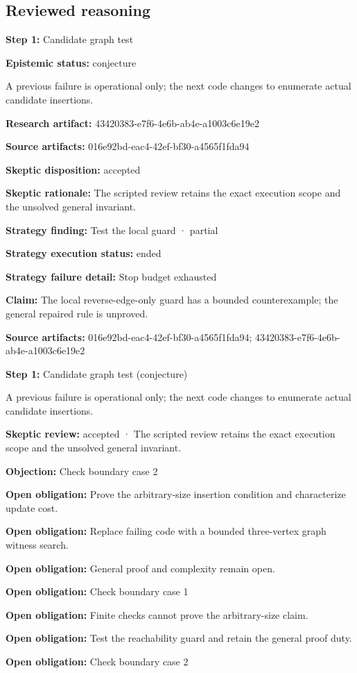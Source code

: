 \documentclass[11pt]{article}
\begin{document}
\subsection{Reviewed reasoning}
\textbf{Step 1:} Candidate graph test\par
\textbf{Epistemic status:} conjecture\par
A previous failure is operational only; the next code changes to enumerate actual candidate insertions.\par
\textbf{Research artifact:} 43420383-e7f6-4e6b-ab4e-a1003c6e19e2\par
\textbf{Source artifacts:} 016e92bd-eac4-42ef-bf30-a4565f1fda94\par
\textbf{Skeptic disposition:} accepted\par
\textbf{Skeptic rationale:} The scripted review retains the exact execution scope and the unsolved general invariant.\par
\textbf{Strategy finding:} Test the local guard · partial\par
\textbf{Strategy execution status:} ended\par
\textbf{Strategy failure detail:} Stop budget exhausted\par
\textbf{Claim:} The local reverse-edge-only guard has a bounded counterexample; the general repaired rule is unproved.\par
\textbf{Source artifacts:} 016e92bd-eac4-42ef-bf30-a4565f1fda94; 43420383-e7f6-4e6b-ab4e-a1003c6e19e2\par
\textbf{Step 1:} Candidate graph test (conjecture)\par
A previous failure is operational only; the next code changes to enumerate actual candidate insertions.\par
\textbf{Skeptic review:} accepted · The scripted review retains the exact execution scope and the unsolved general invariant.\par
\textbf{Objection:} Check boundary case 2\par
\textbf{Open obligation:} Prove the arbitrary-size insertion condition and characterize update cost.\par
\textbf{Open obligation:} Replace failing code with a bounded three-vertex graph witness search.\par
\textbf{Open obligation:} General proof and complexity remain open.\par
\textbf{Open obligation:} Check boundary case 1\par
\textbf{Open obligation:} Finite checks cannot prove the arbitrary-size claim.\par
\textbf{Open obligation:} Test the reachability guard and retain the general proof duty.\par
\textbf{Open obligation:} Check boundary case 2\par
\end{document}
